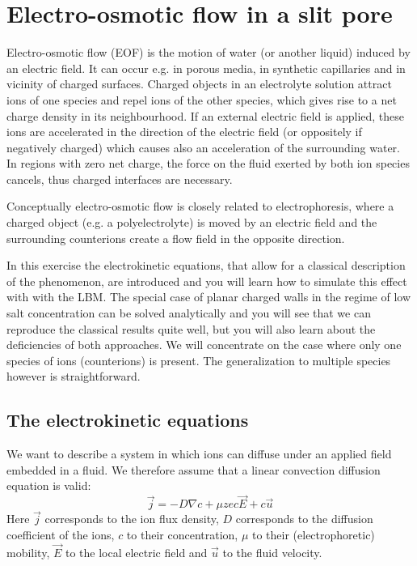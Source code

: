 \chapter{Electro-osmotic flow in a slit pore}
Electro-osmotic flow (EOF) is the motion of water (or another liquid)
induced by an electric field. It can occur e.g. in porous media,
in synthetic capillaries and in vicinity of charged surfaces.
Charged objects in an electrolyte solution attract ions of one
species and repel ions of the other species, which gives rise
to a net charge density in its neighbourhood. If an external
electric field is applied, these ions are accelerated in the direction
of the electric field (or oppositely if negatively charged) which
causes also an acceleration of the surrounding water. In regions
with zero net charge, the force on the fluid exerted by both ion
species cancels, thus charged interfaces are necessary.

Conceptually electro-osmotic flow is closely related to electrophoresis,
where a charged object (e.g. a polyelectrolyte) is moved by an
electric field and the surrounding counterions create a flow field
in the opposite direction. 

In this exercise the electrokinetic equations, that allow for a classical
description of the phenomenon, are introduced and you will learn
how to simulate this effect with \ES{} with the LBM. The special case of
planar charged walls in the regime of low salt concentration can
be solved analytically and you will see that we can reproduce the
classical results quite well, but you will also learn about the
deficiencies of both approaches. We will concentrate on the case
where only one species of ions (counterions) is present. The generalization
to multiple species however is straightforward.

\section{The electrokinetic equations}
We want to describe a system in which ions can diffuse under an
applied field embedded in a fluid. We therefore assume that a 
linear convection diffusion equation is valid:
\begin{equation}
  \vec{j}=-D \nabla c + \mu ze c \vec{E} + c \vec{u}
\end{equation}
Here $\vec{j}$ corresponds to the ion flux density, $D$ corresponds 
to the diffusion coefficient of the ions,
$c$ to their concentration, $\mu$ to their (electrophoretic)
mobility, $\vec{E}$ to the local electric field and $\vec{u}$
to the fluid velocity.

